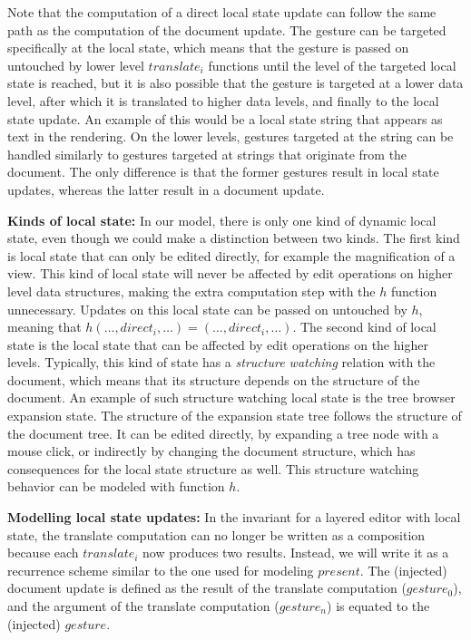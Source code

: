 Note that the computation of a direct local state update can follow the same path as the computation of the document update. The gesture can be targeted specifically at the local state, which means that the gesture is passed on untouched by lower level $translate_i$ functions until the level of the targeted local state is reached, but it is also possible that the gesture is targeted at a lower data level, after which it is translated to higher data levels, and finally to the local state update. An example of this would be a local state string that appears as text in the rendering. On the lower levels, gestures targeted at the string can be handled similarly to gestures targeted at strings that originate from the document. The only difference is that the former gestures result in local state updates, whereas the latter result in a document update.

{\bf Kinds of local state: }In our model, there is only one kind of dynamic local state, even though we could make a distinction between two kinds. The first kind is local state that can only be edited directly, for example the magnification of a view. This kind of local \pagebreak state will never be affected by edit operations on higher level data structures, making the extra computation step with the $h$ function unnecessary. Updates on this local state can be passed on untouched by $h$, meaning that $h (\dots, direct_i,\dots) = (\dots, direct_i, \dots)$. The second kind of local state is the local state that can be affected by edit operations on the higher levels. Typically, this kind of state has a {\em structure watching} relation with the document, which means that its structure depends on the structure of the document. An example of such structure watching local state is the tree browser expansion state. The structure of the expansion state tree follows the structure of the document tree.  It can be edited directly, by expanding a tree node with a mouse click, or indirectly by changing the document structure, which has consequences for the local state structure as well. This structure watching behavior can be modeled with function $h$.







{\bf Modelling local state updates: }In the invariant for a layered editor with local state, the translate computation can no longer be written as a composition because each $translate_i$ now produces two results. Instead, we will write it as a recurrence scheme similar to the one used for modeling $present$. The (injected) document update is defined as the result of the translate computation ($gesture_0$), and the argument of the translate computation ($gesture_n$) is equated to the (injected) $gesture$. 

